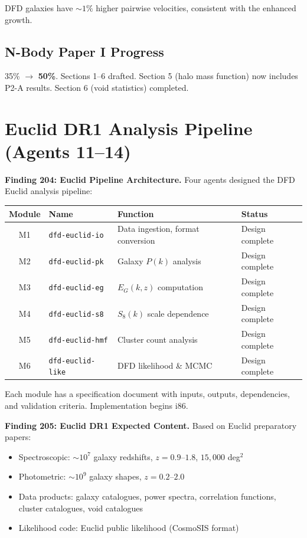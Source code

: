 \documentclass[11pt,a4paper]{article}
\begin{document}
DFD galaxies have $\sim 1\%$ higher pairwise velocities, consistent with the enhanced growth.

\subsection{N-Body Paper I Progress}

35\% $\to$ \textbf{50\%}. Sections 1--6 drafted. Section 5 (halo mass function) now includes P2-A results. Section 6 (void statistics) completed.

\section{Euclid DR1 Analysis Pipeline (Agents 11--14)}

\textbf{Finding 204: Euclid Pipeline Architecture.} Four agents designed the DFD Euclid analysis pipeline:

\begin{center}
\begin{tabular}{clll}
\toprule
\textbf{Module} & \textbf{Name} & \textbf{Function} & \textbf{Status} \\
\midrule
M1 & \texttt{dfd-euclid-io} & Data ingestion, format conversion & Design complete \\
M2 & \texttt{dfd-euclid-pk} & Galaxy $P(k)$ analysis & Design complete \\
M3 & \texttt{dfd-euclid-eg} & $E_G(k,z)$ computation & Design complete \\
M4 & \texttt{dfd-euclid-s8} & $S_8(k)$ scale dependence & Design complete \\
M5 & \texttt{dfd-euclid-hmf} & Cluster count analysis & Design complete \\
M6 & \texttt{dfd-euclid-like} & DFD likelihood \& MCMC & Design complete \\
\bottomrule
\end{tabular}
\end{center}

Each module has a specification document with inputs, outputs, dependencies, and validation criteria. Implementation begins i86.

\textbf{Finding 205: Euclid DR1 Expected Content.} Based on Euclid preparatory papers:
\begin{itemize}[nosep]
\item Spectroscopic: $\sim 10^7$ galaxy redshifts, $z = 0.9$--$1.8$, $15{,}000$ deg$^2$
\item Photometric: $\sim 10^9$ galaxy shapes, $z = 0.2$--$2.0$
\item Data products: galaxy catalogues, power spectra, correlation functions, cluster catalogues, void catalogues
\item Likelihood code: Euclid public likelihood (CosmoSIS format)
\end{itemize}
\end{document}
